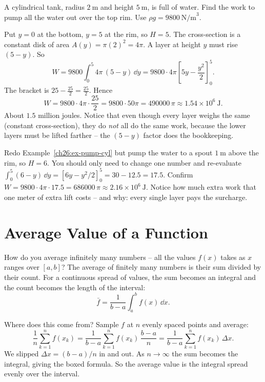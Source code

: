 \begin{example}
\label{ch26:ex-pump-cyl}
A cylindrical tank, radius $2\ \text{m}$ and height $5\ \text{m}$, is full of water.
Find the work to pump all the water out over the top rim. Use $\rho g = 9800\
\text{N/m}^3$.

Put $y=0$ at the bottom, $y=5$ at the rim, so $H=5$. The cross-section is a constant
disk of area $A(y) = \pi(2)^2 = 4\pi$. A layer at height $y$ must rise $(5-y)$. So
\[
  W = 9800\int_0^5 4\pi\,(5-y)\,\dd y
    = 9800\cdot 4\pi\left[5y - \frac{y^2}{2}\right]_0^5.
\]
The bracket is $25 - \tfrac{25}{2} = \tfrac{25}{2}$. Hence
\[
  W = 9800\cdot 4\pi\cdot\frac{25}{2} = 9800\cdot 50\pi = 490000\,\pi
    \approx 1.54\times 10^{6}\ \text{J}.
\]
About $1.5$ million joules. Notice that even though every layer weighs the same
(constant cross-section), they do \emph{not} all do the same work, because the
lower layers must be lifted farther -- the $(5-y)$ factor does the bookkeeping.
\end{example}

\begin{labbox}
Redo Example~\ref{ch26:ex-pump-cyl} but pump the water to a spout $1\ \text{m}$
above the rim, so $H=6$. You should only need to change one number and re-evaluate
$\int_0^5 (6-y)\,\dd y = [6y - y^2/2]_0^5 = 30 - 12.5 = 17.5$. Confirm
$W = 9800\cdot 4\pi\cdot 17.5 = 686000\,\pi \approx 2.16\times 10^6\ \text{J}$.
Notice how much extra work that one meter of extra lift costs -- and why: every
single layer pays the surcharge.
\end{labbox}

\section{Average Value of a Function}
\label{ch26:average}

How do you average infinitely many numbers -- all the values $f(x)$ takes as $x$
ranges over $[a,b]$? The average of finitely many numbers is their sum divided by
their count. For a continuous spread of values, the sum becomes an integral and the
count becomes the length of the interval:
\[
  \boxed{\,\bar f = \frac{1}{b-a}\int_a^b f(x)\,\dd x.\,}
\]

Where does this come from? Sample $f$ at $n$ evenly spaced points and average:
\[
  \frac{1}{n}\sum_{k=1}^n f(x_k)
  = \frac{1}{b-a}\sum_{k=1}^n f(x_k)\,\frac{b-a}{n}
  = \frac{1}{b-a}\sum_{k=1}^n f(x_k)\,\Delta x.
\]
We slipped $\Delta x = (b-a)/n$ in and out. As $n\to\infty$ the sum becomes the
integral, giving the boxed formula. So the average value is the integral spread
evenly over the interval.

